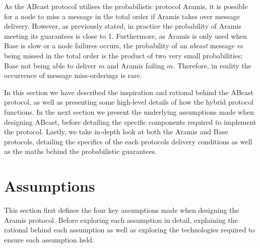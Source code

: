 As the \textsf{ABcast} protocol utilises the probabilistic protocol \textsf{Aramis}, it is possible for a node to miss a message in the total order if \textsf{Aramis} takes over message delivery.  However, as previously stated, in practice the probability of \textsf{Aramis} meeting its guarantees is close to 1.  Furthermore, as \textsf{Aramis} is only used when \textsf{Base} is slow or a node failures occurs, the probability of an \emph{abcast} message $m$ being missed in the total order is the product of two very small probabilities; \textsf{Base} not being able to deliver $m$ and \textsf{Aramis} failing $m$.  Therefore, in reality the occurrence of message miss-orderings is rare.  

In this section we have described the inspiration and rational behind the \textsf{ABcast} protocol, as well as presenting some high-level details of how the hybrid protocol functions.  In the next section we present the underlying assumptions made when designing \textsf{ABcast}, before detailing the specific components required to implement the protocol.  Lastly, we take in-depth look at both the \textsf{Aramis} and \textsf{Base} protocols, detailing the specifics of the each protocols delivery conditions as well as the maths behind the probabilistic guarantees.  

\newpage
\section{Assumptions}
	This section first defines the four key assumptions made when designing the \textsf{Aramis} protocol.  Before exploring each assumption in detail, explaining the rational behind each assumption as well as exploring the technologies required to ensure each assumption held.  

